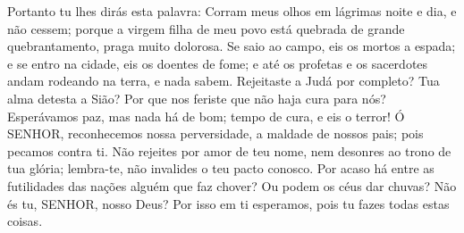 {Portanto tu lhes dirás esta palavra: Corram meus olhos em lágrimas noite e dia, e não cessem; porque a virgem filha de meu povo está quebrada de grande quebrantamento,
{} praga muito dolorosa.
Se saio ao campo, eis os mortos a espada; e se entro na cidade, eis os doentes de fome; e até os profetas e os sacerdotes andam rodeando na terra, e nada sabem.
Rejeitaste a Judá por completo? Tua alma detesta a Sião? Por que nos feriste
{} que não haja cura para nós? Esperávamos paz, mas nada há de bom;
{} tempo de cura, e eis o terror!
Ó SENHOR, reconhecemos nossa perversidade, a maldade de nossos pais; pois pecamos contra ti.
Não
{} rejeites por amor de teu nome, nem desonres ao trono de tua glória; lembra-te, não invalides o teu pacto conosco.
Por acaso há entre as futilidades
 das nações alguém que faz chover? Ou podem os céus dar chuvas? Não és
{} tu, SENHOR, nosso Deus? Por isso em ti esperamos, pois tu fazes todas estas coisas.

\par }

